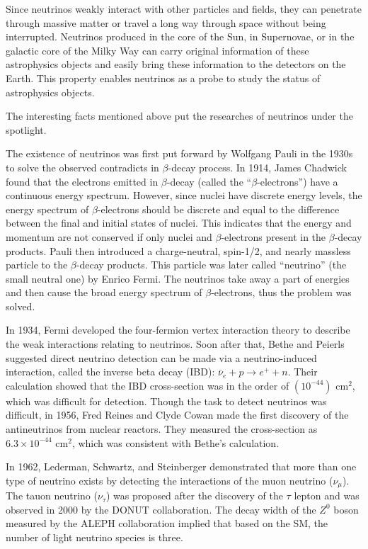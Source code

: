 Since neutrinos weakly interact with other particles and fields, they can penetrate through massive matter or travel a long way through space without being interrupted. Neutrinos produced in the core of the Sun, in Supernovae, or in the galactic core of the Milky Way can carry original information of these astrophysics objects and easily bring these information to the detectors on the Earth. This property enables neutrinos as a probe to study the status of astrophysics objects.

The interesting facts mentioned above put the researches of neutrinos under the spotlight. 

The existence of neutrinos was first put forward by Wolfgang Pauli in the 1930s to solve the observed contradicts in $\beta$-decay process. In 1914, James Chadwick found that the electrons emitted in $\beta$-decay (called the ``$\beta$-electrons'') have a continuous energy spectrum\cite{leite1996weak}. However, since nuclei have discrete energy levels, the energy spectrum of $\beta$-electrons should be discrete and equal to the difference between the final and initial states of nuclei. This indicates that the energy and momentum are not conserved if only nuclei and $\beta$-electrons present in the $\beta$-decay products. Pauli then introduced a charge-neutral, spin-1/2, and nearly massless particle to the $\beta$-decay products. This particle was later called ``neutrino'' (the small neutral one) by Enrico Fermi. The neutrinos take away a part of energies and then cause the broad energy spectrum of $\beta$-electrons, thus the problem was solved.

In 1934, Fermi developed the four-fermion vertex interaction theory to describe the weak interactions relating to neutrinos. Soon after that, Bethe and Peierls suggested direct neutrino detection can be made via a neutrino-induced interaction, called the inverse beta decay (IBD): $\bar{\nu}_e+p\to e^+ + n$. Their calculation showed that the IBD cross-section was in the order of $(10^{-44})$ cm$^2$, which was difficult for detection\cite{bethe1934neutrino}. Though the task to detect neutrinos was difficult, in 1956, Fred Reines and Clyde Cowan made the first discovery of the antineutrinos from nuclear reactors. They measured the cross-section as $6.3\times10^{-44}$ cm$^2$, which was consistent with Bethe's calculation\cite{reines1960detection}.

In 1962, Lederman, Schwartz, and Steinberger demonstrated that more than one type of neutrino exists by detecting the interactions of the muon neutrino ($\nu_\mu$)\cite{danby1962observation}. The tauon neutrino ($\nu_\tau$) was proposed after the discovery of the $\tau$ lepton and was observed in 2000 by the DONUT collaboration\cite{kodama2001observation}. The decay width of the $Z^0$ boson measured by the ALEPH collaboration implied that based on the SM, the number of light neutrino species is three\cite{decamp1989determination}.

